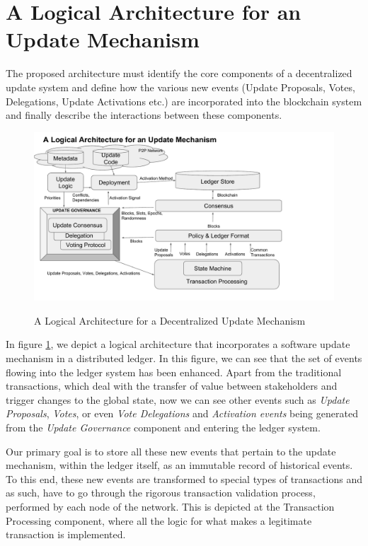 \section{A Logical Architecture for an Update Mechanism}
The proposed architecture must identify the core components of a decentralized update system and define how the various new events (Update Proposals, Votes, Delegations, Update Activations etc.) are incorporated into the blockchain system and finally describe the interactions between these components.

\begin{figure}[H]
    \caption{A Logical Architecture for a Decentralized Update Mechanism}
    \centering
    \includegraphics[width=0.9 \columnwidth,keepaspectratio]{figures/logical_architecture_v3.pdf}
    \label{logarch}
\end{figure}

In figure \ref{logarch}, we depict a logical architecture that incorporates a software update mechanism in a distributed ledger. In this figure, we can see that the set of events flowing into the ledger system has been enhanced. Apart from the traditional transactions, which deal with the transfer of value between stakeholders and trigger changes to the global state, now we can see other events such as \emph{Update Proposals}, \emph{Votes}, or even \emph{Vote Delegations} and \emph{Activation events} being generated from the \emph{Update Governance} component and entering the ledger system.

Our primary goal is to store all these new events that pertain to the update mechanism, within the ledger itself, as an immutable record of historical events. To this end, these new events are transformed to special types of transactions and as such, have to go through the rigorous transaction validation process, performed by each node of the network. This is depicted at the Transaction Processing component, where all the logic for what makes a legitimate transaction is implemented.

